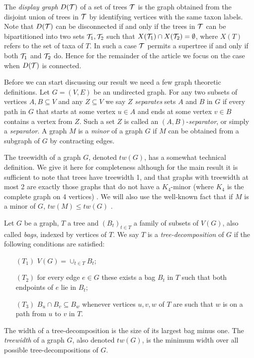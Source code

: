 The \emph{display graph} $D({\mathcal T})$ of a set of trees ${\mathcal T}$ is the graph obtained from the disjoint union of trees in ${\mathcal T}$ by identifying vertices with the same taxon labels. Note that $D({\mathcal T})$ can be disconnected if and only if the trees in ${\mathcal T}$ can be bipartitioned into two sets ${\mathcal T}_1, {\mathcal T}_2$ such that $X({\mathcal T}_1) \cap X({\mathcal T}_2) = \emptyset$, where $X(T)$ refers to the set of taxa of $T$. In such a case ${\mathcal T}$ permits a supertree if and only if both ${\mathcal T}_1$ and ${\mathcal T}_2$ do. Hence for the remainder of the article we focus on the case when $D({\mathcal T})$ is connected. 


Before we can start discussing our result we need a few graph theoretic definitions.  Let $G=(V, E)$ be an undirected graph. For any two subsets of vertices $A,B \subseteq V$ and any $Z \subseteq V$ we say $Z$ \emph{separates} sets $A$ and $B$ in $G$ if every path in $G$ that starts at some vertex $u \in A$ and ends at some vertex $v \in B$ contains a vertex from $Z$. Such a set $Z$ is called an $(A,B)$-\emph{separator}, or simply  a \emph{separator}. A graph $M$ is a \emph{minor} of a graph $G$ if $M$ can be obtained from a subgraph of $G$ by contracting edges.



The treewidth of a graph $G$, denoted $tw(G)$, has a somewhat technical definition. We give it here for completeness although for the main result it is sufficient to note that trees have treewidth 1, and that graphs with treewidth at most 2 are exactly those graphs that do not have a $K_4$-minor (where $K_4$ is the complete graph on 4 vertices) \cite{diestel2000graph}. We will also use the well-known fact that if $M$ is a minor of $G$, $tw(M) \leq tw(G)$ \cite{diestel2000graph}.


Let $G$ be a graph, $T$ a tree and $(B_t)_{t\in T}$ a family of subsets of $V(G)$, also called \emph{bags}, indexed by vertices of $T$. We say $T$ is a \emph{tree-decomposition} of $G$ if the following conditions are satisfied:
  \begin{itemize}
    \item[$(T_1)$] $V(G) = \cup_{t\in T} B_t$;
    \item[$(T_2)$] for every edge $e \in G$ these exists a bag $B_t$ in $T$ such that both endpoints of $e$ lie in $B_t$;
    \item[$(T_3)$] $B_u \cap B_v \subseteq B_w$ whenever vertices $u,v,w$ of $T$ are such that $w$ is on a path from $u$ to $v$ in $T$.
  \end{itemize}
The width of a tree-decomposition is the size of its largest bag minus one. The \emph{treewidth} of a graph $G$, also denoted $tw(G)$, is the minimum width over all possible tree-decompositions of $G$.

